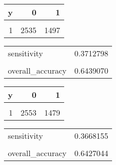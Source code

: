 \begin{table}
\centering\caption{Table:  m3.1_postclass}
\begin{table}

\centering
\fontsize{10}{12}\selectfont
\begin{tabular}[t]{rrr}
\toprule
y & 0 & 1\\
\midrule
\cellcolor{gray!10}{0} & \cellcolor{gray!10}{3322} & \cellcolor{gray!10}{130}\\
1 & 2535 & 1497\\
\bottomrule
\end{tabular}
\end{table}\begin{table}

\centering
\begin{tabular}[t]{lr}
\toprule
\cellcolor{gray!10}{ } & \cellcolor{gray!10}{}\\
\midrule
sensitivity & 0.3712798\\
\cellcolor{gray!10}{specificity} & \cellcolor{gray!10}{0.9623407}\\
overall\_accuracy & 0.6439070\\
\bottomrule
\end{tabular}
\end{table}
\end{table}

\begin{table}
\centering\caption{Table:  m4_postclass}
\begin{table}

\centering
\fontsize{10}{12}\selectfont
\begin{tabular}[t]{rrr}
\toprule
y & 0 & 1\\
\midrule
\cellcolor{gray!10}{0} & \cellcolor{gray!10}{3331} & \cellcolor{gray!10}{121}\\
1 & 2553 & 1479\\
\bottomrule
\end{tabular}
\end{table}\begin{table}

\centering
\begin{tabular}[t]{lr}
\toprule
\cellcolor{gray!10}{ } & \cellcolor{gray!10}{}\\
\midrule
sensitivity & 0.3668155\\
\cellcolor{gray!10}{specificity} & \cellcolor{gray!10}{0.9649479}\\
overall\_accuracy & 0.6427044\\
\bottomrule
\end{tabular}
\end{table}
\end{table}

